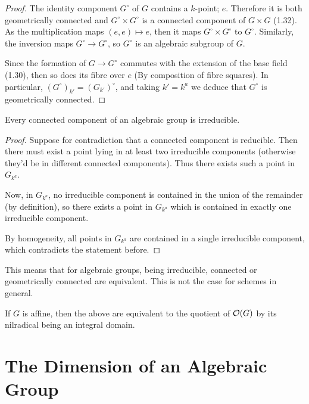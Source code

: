 \documentclass{memoir}
\begin{document}
\begin{proof}
	The identity component $G^\circ$ of $G$ contains a $k$-point; $e$.
	Therefore it is both geometrically connected and $G^\circ\times G^\circ$
	is a connected component of $G \times G$ (1.32). As the
	multiplication maps $(e,e)\mapsto e$, then it maps $G^\circ\times G^\circ$
	to $G^\circ$. Similarly, the inversion maps $G^\circ \to G^\circ$, so
	$G^\circ$ is an algebraic subgroup of $G$.
	
	Since the formation of $G \to G^\circ$ commutes with the extension of
	the base field (1.30), then so does its fibre over $e$ (By composition of
	fibre squares). In particular,
	$(G^\circ)_{k'} = (G_{k'})^\circ$, and taking $k' = k^a$ we deduce that
	$G^\circ$ is geometrically connected.
\end{proof}

\begin{corollary}[1.35]
	Every connected component of an algebraic group is irreducible.
\end{corollary}

\begin{proof}
	Suppose for contradiction that a connected component is reducible.
	Then there must exist a point lying in at least two irreducible components
	(otherwise they'd be in different connected components).
	Thus there exists such a point in $G_{k^a}$.
	
	Now, in $G_{k^a}$, no
	irreducible component is contained in the union of the remainder
	(by definition), so there exists a point in $G_{k^a}$ which is
	contained in exactly one irreducible component.
	
	By homogeneity, all points in $G_{k^a}$ are contained in a single
	irreducible component, which contradicts the statement before.
\end{proof}

\begin{remark}
	This means that for algebraic groups, being irreducible, connected
	or geometrically connected are equivalent. This is not the case
	for schemes in general.
	
	If $G$ is affine, then the above are equivalent to the quotient
	of $\mathcal{O}(G)$ by its nilradical being an integral domain.
\end{remark}

\section{The Dimension of an Algebraic Group}
\end{document}
